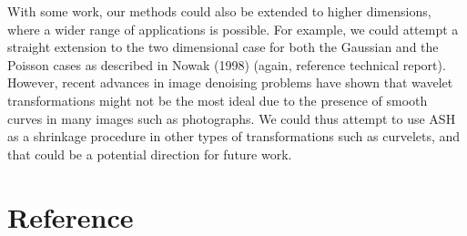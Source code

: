 \documentclass[12pt]{article}
\begin{document}
With some work, our methods could also be extended to higher dimensions, where a wider range of applications is possible. For example, we could attempt a straight extension to the two dimensional case for both the Gaussian and the Poisson cases as described in Nowak (1998) (again, reference technical report). However, recent advances in image denoising problems have shown that wavelet transformations might not be the most ideal due to the presence of smooth curves in many images such as photographs. We could thus attempt to use ASH as a shrinkage procedure in other types of transformations such as curvelets, and that could be a potential direction for future work.
\newpage
\section{Reference}
\end{document}
